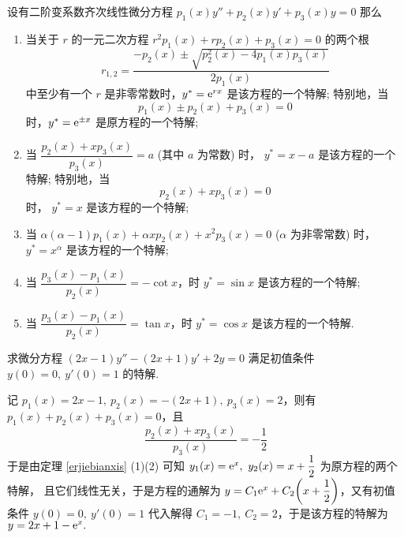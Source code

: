 \begin{theorem}
    设有二阶变系数齐次线性微分方程 $p_1(x)y''+p_2(x)y'+p_3(x)y=0$ 那么 \label{erjiebianxis}
    \begin{enumerate}[label=(\arabic{*})]
        \item 当关于 $r$ 的一元二次方程 $r^2p_1(x)+rp_2(x)+p_3(x)=0$ 的两个根
              $$r_{1,2}=\dfrac{-p_2(x)\pm\sqrt{p_2^2(x)-4p_1(x)p_3(x)}}{2p_1(x)}$$
              中至少有一个 $r$ 是非零常数时，$y^*=\mathrm{e} ^{rx}$ 是该方程的一个特解;
              特别地，当 $$p_1(x)\pm p_2(x)+p_3(x)=0$$
              时，$y^*=\mathrm{e} ^{\pm x}$ 是原方程的一个特解;
        \item 当 $\dfrac{p_2(x)+xp_3(x)}{p_3(x)}=a$ (其中 $a$ 为常数) 时，
              $y^*=x-a$ 是该方程的一个特解; 特别地，当 $$p_2(x)+xp_3(x)=0$$ 时，
              $y^*=x$ 是该方程的一个特解;
        \item 当 $\alpha(\alpha-1)p_1(x)+\alpha xp_2(x)+x^2p_3(x)=0$ ($\alpha$ 为非零常数) 时，
              $y^*=x^\alpha$ 是该方程的一个特解;
        \item 当 $\dfrac{p_3(x)-p_1(x)}{p_2(x)}=-\cot x$，时 $y^*=\sin x$ 是该方程的一个特解;
        \item 当 $\dfrac{p_3(x)-p_1(x)}{p_2(x)}=\tan x$，时 $y^*=\cos x$ 是该方程的一个特解.
    \end{enumerate}
\end{theorem}

\begin{example}
    求微分方程 $(2x-1)y''-(2x+1)y'+2y=0$ 满足初值条件 $y(0)=0,~y'(0)=1$ 的特解.
\end{example}
\begin{solution}
    记 $p_1(x)=2x-1,~p_2(x)=-(2x+1),~p_3(x)=2$，则有 $p_1(x)+p_2(x)+p_3(x)=0$，且
    $$\dfrac{p_2(x)+xp_3(x)}{p_3(x)}=-\dfrac{1}{2}$$
    于是由定理 \ref{erjiebianxis} (1)(2) 可知 $y_1(x)=\mathrm{e} ^x,~y_2(x)=x+\dfrac{1}{2}$ 为原方程的两个特解，
    且它们线性无关，于是方程的通解为 $y=C_1\mathrm{e} ^x+C_2\qty(x+\dfrac{1}{2})$，又有初值条件 $y(0)=0,~y'(0)=1$ 代入解得
    $C_1=-1,~C_2=2$，于是该方程的特解为 $y=2x+1-\mathrm{e} ^x.$
\end{solution}


